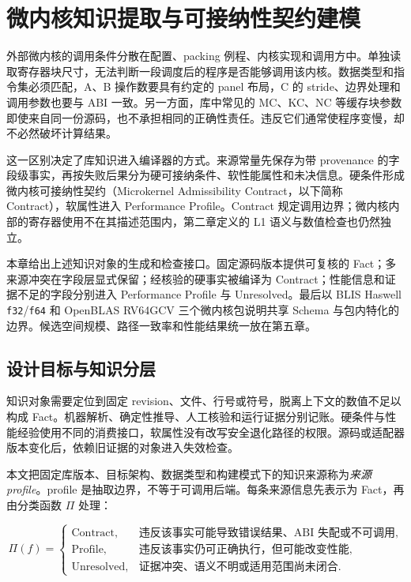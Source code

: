 
\chapter{微内核知识提取与可接纳性契约建模}
\label{chap:knowledge-contract}

外部微内核的调用条件分散在配置、packing 例程、内核实现和调用方中。单独读取寄存器块尺寸，无法判断一段调度后的程序是否能够调用该内核。数据类型和指令集必须匹配，A、B 操作数要具有约定的 panel 布局，C 的 stride、边界处理和调用参数也要与 ABI 一致。另一方面，库中常见的 MC、KC、NC 等缓存块参数即使来自同一份源码，也不承担相同的正确性责任。违反它们通常使程序变慢，却不必然破坏计算结果。

这一区别决定了库知识进入编译器的方式。来源常量先保存为带 provenance 的字段级事实，再按失败后果分为硬可接纳条件、软性能属性和未决信息。硬条件形成微内核可接纳性契约（Microkernel Admissibility Contract，以下简称 Contract），软属性进入 Performance Profile。Contract 规定调用边界；微内核内部的寄存器使用不在其描述范围内，第二章定义的 L1 语义与数值检查也仍然独立。

本章给出上述知识对象的生成和检查接口。固定源码版本提供可复核的 Fact；多来源冲突在字段层显式保留；经核验的硬事实被编译为 Contract；性能信息和证据不足的字段分别进入 Performance Profile 与 Unresolved。最后以 BLIS Haswell \texttt{f32}/\texttt{f64} 和 OpenBLAS RV64GCV 三个微内核包说明共享 Schema 与包内特化的边界。候选空间规模、路径一致率和性能结果统一放在第五章。

\section{设计目标与知识分层}

知识对象需要定位到固定 revision、文件、行号或符号，脱离上下文的数值不足以构成 Fact。机器解析、确定性推导、人工核验和运行证据分别记账。硬条件与性能经验使用不同的消费接口，软属性没有改写安全退化路径的权限。源码或适配器版本变化后，依赖旧证据的对象进入失效检查。

本文把固定库版本、目标架构、数据类型和构建模式下的知识来源称为\emph{来源 profile}。profile 是抽取边界，不等于可调用后端。每条来源信息先表示为 Fact，再由分类函数 $\Pi$ 处理：

\begin{equation}
\Pi(f)=
\begin{cases}
\mathrm{Contract}, &
\text{违反该事实可能导致错误结果、ABI 失配或不可调用},\\
\mathrm{Profile}, &
\text{违反该事实仍可正确执行，但可能改变性能},\\
\mathrm{Unresolved}, &
\text{证据冲突、语义不明或适用范围尚未闭合}.
\end{cases}
\label{eq:chapter3-fact-classification}
\end{equation}

